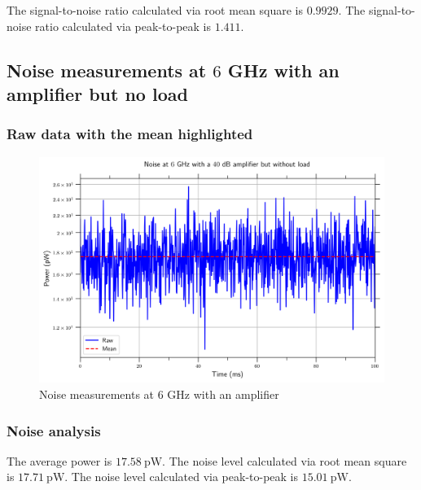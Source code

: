 \documentclass[english,12pt,a4paper]{article}
\begin{document}
	The signal-to-noise ratio calculated via root mean square is $0.9929$.
	The signal-to-noise ratio calculated via peak-to-peak is $1.411$.

\hypertarget{noise-measurements-at-6-ghz-with-an-amplifier-but-no-load}{%
	\subsection{\texorpdfstring{Noise measurements at \(6\) GHz with an
			amplifier but no
			load}{Noise measurements at 6 GHz with an amplifier but no load}}\label{noise-measurements-at-6-ghz-with-an-amplifier-but-no-load}}

 

\hypertarget{raw-data-with-the-mean-highlighted}{%
	\subsubsection{Raw data with the mean
		highlighted}\label{raw-data-with-the-mean-highlighted_2}}

\begin{figure}[H]
	\includegraphics[width=1\linewidth]{Plots/noise_floor_6_GHz_amplif}
	\caption{Noise measurements at 6 GHz with an amplifier}
	\label{fig:noisefloor6ghzamplif}
\end{figure}
 

\hypertarget{noise-analysis}{%
	\subsubsection{Noise analysis}\label{noise-analysis_3}}


	The average power is $\qty{17.58}{\pico\watt}$.
	The noise level calculated via root mean square is $\qty{17.71}{\pico\watt}$.
	The noise level calculated via peak-to-peak is $\qty{15.01}{\pico\watt}$.
	
\end{document}
